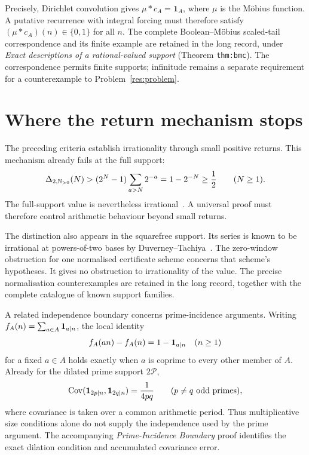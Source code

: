 \documentclass[11pt]{article}
\begin{document}
Precisely, Dirichlet convolution gives
$\mu*c_A=\mathbf1_A$, where $\mu$ is the M\"obius function.
A putative recurrence with integral forcing must therefore satisfy
$(\mu*c_A)(n)\in\{0,1\}$ for all $n$.
The complete Boolean--M\"obius scaled-tail correspondence and its
finite example are retained in the long record, under
\emph{Exact descriptions of a rational-valued support} (Theorem \texttt{thm:bmc}).
The correspondence permits finite supports; infinitude remains a separate
requirement for a counterexample to Problem~\ref{res:problem}.

\section{Where the return mechanism stops}\label{sec:map}
The preceding criteria establish irrationality through small positive
returns.  This mechanism already fails at the full support:
\[
 \Delta_{2,\mathbb{N}_{>0}}(N)
 >(2^N-1)\sum_{a>N}2^{-a}=1-2^{-N}\ge\frac12
 \qquad(N\ge1).
\]
The full-support value is nevertheless irrational~\cite{erdos1968}.
A universal proof must therefore control arithmetic behaviour beyond
small returns.

The distinction also appears in the squarefree support.  Its series is
known to be irrational at powers-of-two bases by
Duverney--Tachiya~\cite[Corollary~1.2 and Example~1.1]{duverneytachiya}.
The zero-window obstruction for one normalised certificate scheme concerns
that scheme's hypotheses.  It gives no obstruction to irrationality of the
value.  The precise normalisation counterexamples are retained in the
long record, together with the complete catalogue of known support families.

A related independence boundary concerns prime-incidence arguments.
Writing $f_A(n)=\sum_{a\in A}{\bf1}_{a\mid n}$, the local identity
\[
 f_A(an)-f_A(n)=1-{\bf1}_{a\mid n}\quad(n\ge1)
\]
for a fixed $a\in A$ holds exactly when $a$ is coprime to every other
member of $A$.  Already for the dilated prime support $2\mathcal P$,
\[
 \operatorname{Cov}({\bf1}_{2p\mid n},{\bf1}_{2q\mid n})
 =\frac1{4pq}\qquad(p\ne q\text{ odd primes}),
\]
where covariance is taken over a common arithmetic period.
Thus multiplicative size conditions alone do not supply the independence
used by the prime argument.  The accompanying \emph{Prime-Incidence
Boundary} proof identifies the exact dilation condition and accumulated
covariance error.
\end{document}
